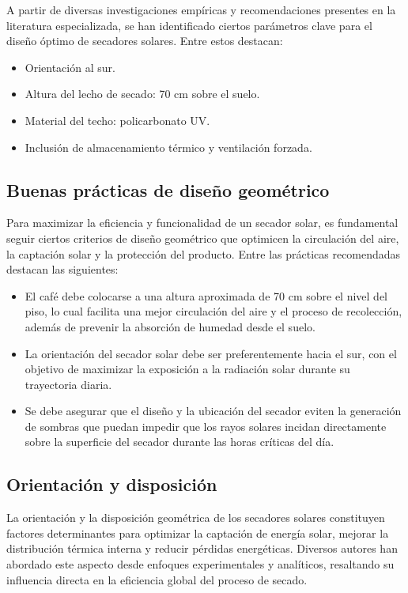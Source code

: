 \documentclass[12pt]{article}
\begin{document}
A partir de diversas investigaciones empíricas y recomendaciones presentes en la literatura especializada, se han identificado ciertos parámetros clave para el diseño óptimo de secadores solares. Entre estos destacan:\\


\begin{itemize}
  \item Orientación al sur.
  \item Altura del lecho de secado: 70 cm sobre el suelo.
  \item Material del techo: policarbonato UV.
  \item Inclusión de almacenamiento térmico y ventilación forzada.
\end{itemize}


\subsection{Buenas prácticas de diseño geométrico}

Para maximizar la eficiencia y funcionalidad de un secador solar, es fundamental seguir ciertos criterios de diseño geométrico que optimicen la circulación del aire, la captación solar y la protección del producto. Entre las prácticas recomendadas destacan las siguientes:

\begin{itemize}
\item El café debe colocarse a una altura aproximada de 70 cm sobre el nivel del piso, lo cual facilita una mejor circulación del aire y el proceso de recolección, además de prevenir la absorción de humedad desde el suelo.
\item La orientación del secador solar debe ser preferentemente hacia el sur, con el objetivo de maximizar la exposición a la radiación solar durante su trayectoria diaria.
\item Se debe asegurar que el diseño y la ubicación del secador eviten la generación de sombras que puedan impedir que los rayos solares incidan directamente sobre la superficie del secador durante las horas críticas del día.
\end{itemize}

\subsection{Orientación y disposición}
La orientación y la disposición geométrica de los secadores solares constituyen factores determinantes para optimizar la captación de energía solar, mejorar la distribución térmica interna y reducir pérdidas energéticas. Diversos autores han abordado este aspecto desde enfoques experimentales y analíticos, resaltando su influencia directa en la eficiencia global del proceso de secado.\\
\end{document}

